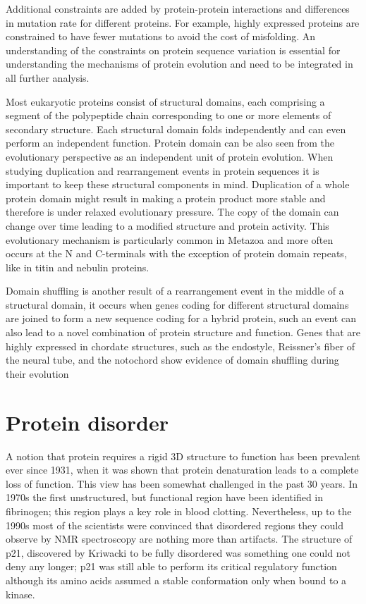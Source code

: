 \documentclass[11pt, a4paper,oneside]{report}
\begin{document}
Additional constraints are added by protein-protein interactions\cite{Park2001} and differences in mutation rate for different proteins. For example, highly expressed proteins are constrained to have fewer mutations to avoid the cost of misfolding\cite{Subramanian2004}. An understanding of the constraints on protein sequence variation is essential for understanding the mechanisms of protein evolution and need to be integrated in all further analysis. 

Most eukaryotic proteins consist of structural domains, each comprising a segment of the polypeptide chain corresponding to one or more elements of secondary structure. Each structural domain folds independently and can even perform an independent function. Protein domain can be also seen from the evolutionary perspective as an independent unit of protein evolution. When studying duplication and rearrangement events in protein sequences it is important to keep these structural components in mind. Duplication of a whole protein domain might result in making a protein product more stable and therefore is under relaxed evolutionary pressure. The copy of the domain can change over time leading to a modified structure and protein activity. This evolutionary mechanism is particularly common in Metazoa and more often occurs at the N and C-terminals with the exception of protein domain repeats\cite{Bjorklund2006,Bjorklund2005}, like in titin\cite{Higgins1994} and nebulin\cite{Bjorklund2010} proteins. 

 Domain shuffling is another result of a rearrangement event in the middle of a structural domain, it occurs when genes coding for different structural domains are joined  to form a new sequence coding for a hybrid protein, such an event can also lead to a novel combination of protein structure and function. Genes that are highly expressed in chordate structures, such as the endostyle, Reissner's fiber of the neural tube, and the notochord show evidence of domain shuffling during their evolution\cite{Kawashima2009}
 
\section{Protein disorder}
A notion that protein requires a rigid 3D structure to function has been prevalent ever since 1931, when it was shown that protein denaturation leads to a complete loss of function\cite{Wu1995}. This view has been somewhat challenged in the past 30 years. In 1970s the first unstructured, but functional region have been identified in fibrinogen; this region plays a key role in blood clotting\cite{Doolittle1973}.  Nevertheless, up to the 1990s most of the scientists were convinced that disordered regions they could observe by NMR spectroscopy are nothing more than artifacts. The structure of p21, discovered by Kriwacki\cite{Kriwacki1996}  to be fully disordered was something one could not deny any longer; p21 was still able to perform its critical regulatory function although its amino acids assumed a stable conformation only when bound to a kinase. 
 
\end{document}
